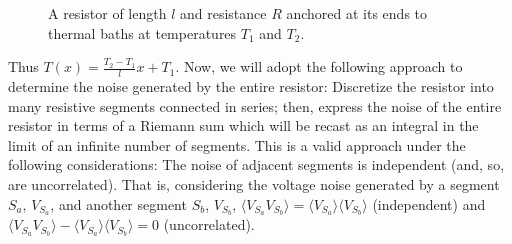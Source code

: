 \documentclass{article}
\begin{document}
\begin{figure}[h]
   \centering
      
      \caption{A resistor of length $l$ and resistance $R$ anchored at its ends
      to thermal baths at temperatures $ T_{1} $ and $ T_{2} $.}
   \label{fig:resistor_at_two_temps}
\end{figure}
Thus $ T(x) = \frac{T_{2}-T_{1}}{l}x +T_{1} $. Now, we will adopt the following
approach to determine the noise generated by the entire resistor: Discretize the
resistor into many resistive segments connected in series; then, express the
noise of the entire resistor in terms of a Riemann sum which will be recast as
an integral in the limit of an infinite number of segments. This is a valid
approach under the following considerations: The noise of adjacent segments is
independent (and, so, are uncorrelated). That is, considering the voltage noise
generated by a segment $S_{a}$, $ V_{S_{a}} $, and another segment $ S_{b} $, $
V_{S_{b}} $, $ \langle V_{S_{a}} V_{S_{b}} \rangle = \langle V_{S_{a}} \rangle
\langle V_{S_{b}} \rangle$ (independent) and $ \langle V_{S_{a}} V_{S_{b}}
\rangle - \langle V_{S_{a}} \rangle \langle V_{S_{b}} \rangle = 0 $
(uncorrelated).
\end{document}

